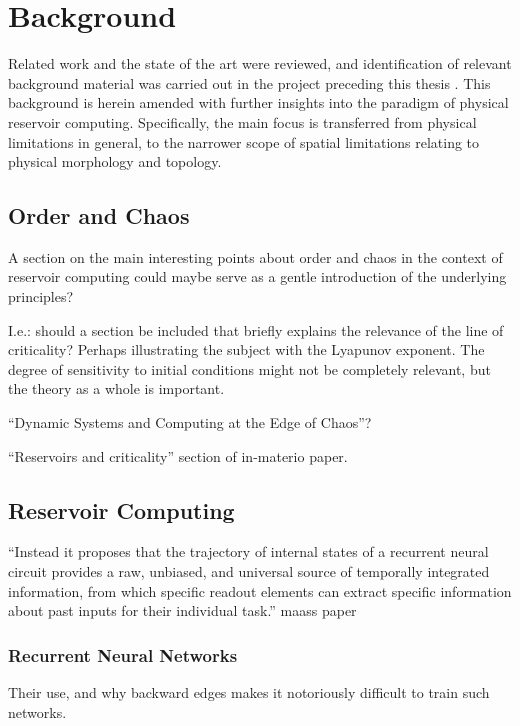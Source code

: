 \chapter{Background}

Related work and the state of the art were reviewed, and identification of
relevant background material was carried out in the project preceding this
thesis \cite{aven_exploring_2019}. This background is herein amended with
further insights into the paradigm of physical reservoir
computing. Specifically, the main focus is transferred from physical limitations
in general, to the narrower scope of spatial limitations relating to physical
morphology and topology.

\section{Order and Chaos}

A section on the main interesting points about order and chaos in the context of
reservoir computing could maybe serve as a gentle introduction of the underlying
principles?

I.e.: should a section be included that briefly explains the relevance of the
line of criticality? Perhaps illustrating the subject with the Lyapunov
exponent. The degree of sensitivity to initial conditions might not be
completely relevant, but the theory as a whole is important.

``Dynamic Systems and Computing at the Edge of Chaos''?

``Reservoirs and criticality'' section of in-materio paper.

\section{Reservoir Computing}

``Instead it proposes that the trajectory of internal states of a recurrent
neural circuit provides a raw, unbiased, and universal source of temporally
integrated information, from which specific readout elements can extract
specific information about past inputs for their individual task.'' maass paper

\subsection{Recurrent Neural Networks}

Their use, and why backward edges makes it notoriously difficult to train such
networks.

